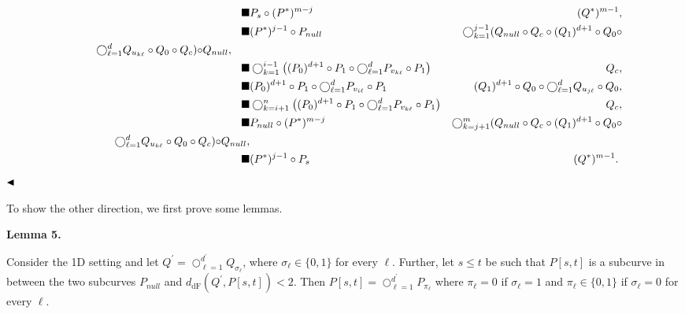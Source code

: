 \[\begin{aligned}
\blacksquare & \displaystyle P_{s}\circ(P^{*})^{m-j} & \displaystyle(Q^{*})^{m-1}, \\
\blacksquare & \displaystyle(P^{*})^{j-1}\circ P_{null} & \displaystyle\bigcirc_{k=1}^{j-1}(Q_{null}\circ Q_{c}\circ(Q_{1})^{d+1}\circ Q%
_{0}\circ \\
\displaystyle\nobreak\ \nobreak\ \nobreak\ \nobreak\ \nobreak\ \nobreak\ %
\nobreak\ \nobreak\ \bigcirc_{\ell=1}^{d}Q_{u_{k\ell}}\circ Q_{0}\circ Q_{c}){%
\circ Q_{null}},\nobreak\ \nobreak\ \nobreak\ \nobreak\ \nobreak\  \\
\blacksquare & \displaystyle\bigcirc_{k=1}^{i-1}\left((P_{0})^{d+1}\circ P_{1}\circ\bigcirc_{%
\ell=1}^{d}P_{v_{k\ell}}\circ P_{1}\right) & \displaystyle Q_{c}, \\
\blacksquare & \displaystyle(P_{0})^{d+1}\circ P_{1}\circ\bigcirc_{\ell=1}^{d}P_{v_{i\ell}}%
\circ P_{1} & \displaystyle(Q_{1})^{d+1}\circ Q_{0}\circ\bigcirc_{\ell=1}^{d}Q_{u_{j\ell}}%
\circ Q_{0}, \\
\blacksquare & \displaystyle\bigcirc_{k=i+1}^{n}\left((P_{0})^{d+1}\circ P_{1}\circ\bigcirc_{%
\ell=1}^{d}P_{v_{k\ell}}\circ P_{1}\right) & \displaystyle Q_{c}, \\
\blacksquare & \displaystyle P_{null}\circ(P^{*})^{m-j} & \displaystyle\bigcirc_{k=j+1}^{m}(Q_{null}\circ Q_{c}\circ(Q_{1})^{d+1}\circ Q%
_{0}\circ \\
\displaystyle\nobreak\ \nobreak\ \nobreak\ \nobreak\ \nobreak\ \nobreak\ %
\nobreak\ \nobreak\ \bigcirc_{\ell=1}^{d}Q_{u_{k\ell}}\circ Q_{0}\circ Q_{c}){%
\circ Q_{null}}, \\
\blacksquare & \displaystyle(P^{*})^{j-1}\circ P_{s} & \displaystyle(Q^{*})^{m-1}.\ 
\end{aligned}\]
$\hfill\blacktriangleleft$
\par
\par
To show the other direction, we first prove some lemmas.
\par
\par
\par\medskip\noindent\textbf{Lemma 5.}\par
Consider the 1D setting and let $Q^{\prime}=\bigcirc_{\ell=1}^{d^{\prime}}Q_{\sigma_{\ell}}$, where $\sigma_{\ell}\in\{0,1\}$ for every $\ell$. Further, let $s\leq t$ be such that $P[s,t]$ is a subcurve in between the two subcurves $P_{null}$ and $d_{\text{dF}}(Q^{\prime},P[s,t])<2$. Then $P[s,t]=\bigcirc_{\ell=1}^{d^{\prime}}P_{\pi_{\ell}}$ where $\pi_{\ell}=0$ if $\sigma_{\ell}=1$ and $\pi_{\ell}\in\{0,1\}$ if $\sigma_{\ell}=0$ for every $\ell$.
